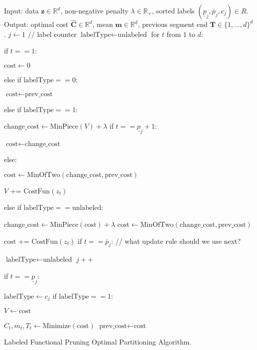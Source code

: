 \documentclass{article}
\newcommand{\RR}{\mathbb R}
\begin{document}
\begin{algorithm}[H]
\begin{algorithmic}[1]
\STATE Input: data $\mathbf z\in\mathbb R^d$, 
non-negative penalty $\lambda\in\RR_+$,
sorted labels $(\underline p_j, \overline p_j, c_j)\in R$.
\STATE Output: optimal cost $\hat{\mathbf C}\in\mathbb R^d$,
mean $\mathbf m\in\mathbb R^d$,
previous segment end $\mathbf T\in\{1,\dots,d\}^d$. 
\STATE $j\gets 1$ // label counter
\STATE $\text{labelType}\gets\text{unlabeled}$
\STATE for $t$ from $1$ to $d$:
\begin{ALC@g}
  \STATE if $t==1$:
  \begin{ALC@g}
    \STATE $\text{cost}\gets 0$
  \end{ALC@g}
  \STATE else if $\text{labelType}==0$:
  \begin{ALC@g}
    \STATE $\text{cost}\gets\text{prev\_cost}$
  \end{ALC@g}
  \STATE else if $\text{labelType}==1$:
  \begin{ALC@g}
    \STATE $\text{change\_cost}\gets \text{MinPiece}(V) + \lambda$
    \STATE if $t==\underline p_j+1$:
    \begin{ALC@g}
      \STATE $\text{cost}\gets\text{change\_cost}$
    \end{ALC@g}
    \STATE else:
    \begin{ALC@g}
      \STATE $\text{cost}\gets\text{MinOfTwo}(
      \text{change\_cost}, \text{prev\_cost})$
    \end{ALC@g}
    \STATE $V$ += $\text{CostFun}(z_t)$
  \end{ALC@g}
  \STATE else if $\text{labelType}==\text{unlabeled}$:
  \begin{ALC@g}
    \STATE $\text{change\_cost}\gets\text{MinPiece}(\text{cost}) + \lambda$
    \STATE $\text{cost}\gets\text{MinOfTwo}( 
    \text{change\_cost}, \text{prev\_cost})$
  \end{ALC@g}
  \STATE $\text{cost}$ += $\text{CostFun}(z_t)$
  \STATE if $t==\overline p_j$: // what update rule should we use next?
  \begin{ALC@g}
    \STATE $\text{labelType}\gets \text{unlabeled}$
    \STATE $j++$
  \end{ALC@g}
  \STATE if $t==\underline p_j$:
  \begin{ALC@g}
    \STATE $\text{labelType}\gets c_j$
    \STATE if $\text{labelType}==1$:
    \begin{ALC@g}
      \STATE $V\gets \text{cost}$
    \end{ALC@g}
  \end{ALC@g}
  \STATE $\hat C_t, m_t, T_t\gets \text{Minimize}(\text{cost})$
  \STATE $\text{prev\_cost}\gets\text{cost}$
\end{ALC@g}
\caption{\label{algo:LabeledFPOP}Labeled Functional Pruning Optimal
  Partitioning Algorithm.}
\end{algorithmic}
\end{algorithm}
\end{document}
